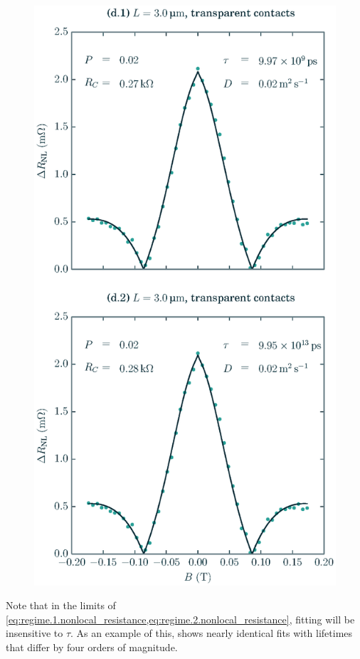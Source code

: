 \begin{figure}[!b]
  \includegraphics[width=\columnwidth]{figures/plot_large_lifetime}
\end{figure}

Note that in the limits of
\cref{eq:regime.1.nonlocal_resistance,eq:regime.2.nonlocal_resistance},
fitting will be insensitive to $τ$.
As an example of this,
 shows nearly identical fits
with lifetimes that differ by four orders of magnitude.

